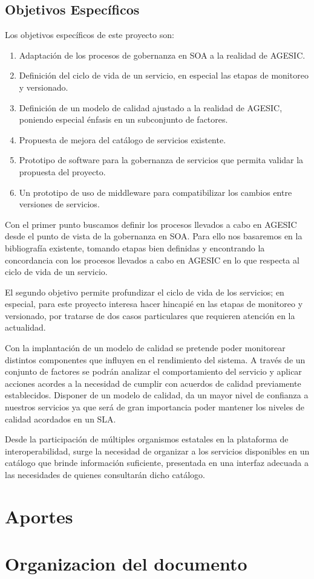 \subsection{Objetivos Específicos}
\label{Introduccion:Objetivos_Especificos}
Los objetivos específicos de este proyecto son:
\begin{enumerate}

  \item Adaptación de los procesos de gobernanza en SOA a la realidad de AGESIC.
  \item Definición del ciclo de vida de un servicio, en especial las etapas de monitoreo y versionado.
  \item Definición de un modelo de calidad ajustado a la realidad de AGESIC, poniendo especial énfasis en un subconjunto de factores.
  \item Propuesta de mejora del catálogo de servicios existente.
  \item Prototipo de software para la gobernanza de servicios que permita validar la propuesta del proyecto.
  \item Un prototipo de uso de middleware para compatibilizar los cambios entre versiones de servicios.
\end{enumerate}

Con el primer punto buscamos definir los procesos llevados a cabo en AGESIC desde el punto de vista de la gobernanza en SOA. Para ello nos basaremos en la bibliografía existente, tomando etapas bien definidas y encontrando la concordancia con los procesos llevados a cabo en AGESIC en lo que respecta al ciclo de vida de un servicio.

El segundo objetivo permite profundizar el ciclo de vida de los servicios; en especial, para este proyecto interesa hacer hincapié en las etapas de monitoreo y versionado, por tratarse de dos casos particulares que requieren atención en la actualidad.

Con la implantación de un modelo de calidad se pretende poder monitorear distintos componentes que influyen en el rendimiento del sistema. A través de un conjunto de factores se podrán analizar el comportamiento del servicio y aplicar acciones acordes a la necesidad de cumplir con acuerdos de calidad previamente establecidos. Disponer de un modelo de calidad, da un mayor nivel de confianza a nuestros servicios ya que será de gran importancia poder mantener los niveles de calidad acordados en un SLA.

Desde la participación de múltiples organismos estatales en la plataforma de interoperabilidad, surge la necesidad de organizar a los servicios disponibles en un catálogo que brinde información suficiente, presentada en una interfaz adecuada a las necesidades de quienes consultarán dicho catálogo.

\section{Aportes}
\label{Introduccion:Aportes}

\section{Organizacion del documento}
\label{Introduccion:Organizacion_del_documento}
